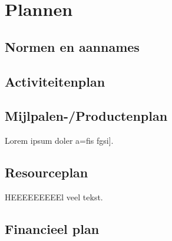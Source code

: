 \section{Plannen}
\subsection{Normen en aannames}
\subsection{Activiteitenplan}
\subsection{Mijlpalen-/Productenplan}
Lorem ipsum doler a=fis fgsi].
\subsection{Resourceplan}
HEEEEEEEEEl veel tekst.
\subsection{Financieel plan}
